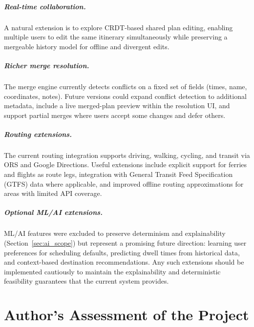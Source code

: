 \paragraph{Real-time collaboration.}
A natural extension is to explore CRDT-based shared plan editing, enabling multiple users to edit the same itinerary simultaneously while preserving a mergeable history model for offline and divergent edits.

\paragraph{Richer merge resolution.}
The merge engine currently detects conflicts on a fixed set of fields (times,
name, coordinates, notes). Future versions could expand conflict detection to
additional metadata, include a live merged-plan preview within the resolution
UI, and support partial merges where users accept some changes and defer others.

\paragraph{Routing extensions.}
The current routing integration supports driving, walking, cycling, and transit
via ORS and Google Directions. Useful extensions include explicit support for
ferries and flights as route legs, integration with General Transit Feed
Specification (GTFS) data where
applicable, and improved offline routing approximations for areas with limited
API coverage.

\paragraph{Optional ML/AI extensions.}
ML/AI features were excluded to preserve determinism and explainability (Section~\ref{sec:ai_scope}) but represent a promising future direction: learning user preferences for scheduling defaults, predicting dwell times from historical data, and context-based destination recommendations. Any such extensions should
be implemented cautiously to maintain the explainability and deterministic
feasibility guarantees that the current system provides.

\chapter*{Author's Assessment of the Project}

